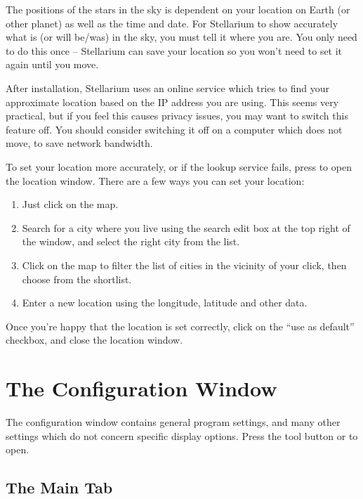 The positions of the stars in the sky is dependent on your location on
Earth (or other planet) as well as the time and date. For Stellarium to
show accurately what is (or will be/was) in the sky, you must tell it
where you are. You only need to do this once -- Stellarium can save your
location so you won't need to set it again until you move.

After installation, Stellarium uses an online service which tries to
find your approximate location based on the IP address you are
using. This seems very practical, but if you feel this causes privacy
issues, you may want to switch this feature off. You should consider
switching it off on a computer which does not move, to save network
bandwidth.

To set your location more accurately, or if the lookup service fails,
press  to open the location window. There are a few ways you
can set your location:

\begin{enumerate}
\item Just click on the map.
\item Search for a city where you live using the search edit box at
  the top right of the window, and select the right city from the
  list.
\item Click on the map to filter the list of cities in the vicinity of
  your click, then choose from the shortlist.
\item Enter a new location using the longitude, latitude and other
  data.
\end{enumerate}

\noindent Once you're happy that the location is set correctly, click on the ``use
as default'' checkbox, and close the location window.



\section{The Configuration Window}
\label{sec:gui:configuration}

The configuration window contains general program settings, and many
other settings which do not concern specific display options. Press
the tool button  or  to open.


\subsection{The Main Tab}
\label{sec:gui:configuration:main}


